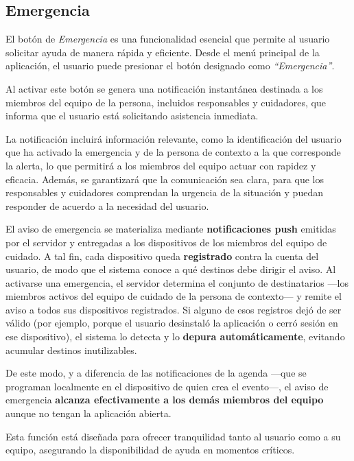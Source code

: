 \documentclass[a4paper,12pt]{article}
\begin{document}
    \subsection{Emergencia}
    \par El botón de \textit{Emergencia} es una funcionalidad esencial que permite al usuario solicitar ayuda de manera rápida y eficiente. Desde el menú principal de la aplicación, el usuario puede presionar el botón designado como \textit{``Emergencia''}.
    \par Al activar este botón se genera una notificación instantánea destinada a los miembros del equipo de la persona, incluidos responsables y cuidadores, que informa que el usuario está solicitando asistencia inmediata.
    \par La notificación incluirá información relevante, como la identificación del usuario que ha activado la emergencia y de la persona de contexto a la que corresponde la alerta, lo que permitirá a los miembros del equipo actuar con rapidez y eficacia. Además, se garantizará que la comunicación sea clara, para que los responsables y cuidadores comprendan la urgencia de la situación y puedan responder de acuerdo a la necesidad del usuario.
    \par El aviso de emergencia se materializa mediante \textbf{notificaciones push} emitidas por el servidor y entregadas a los dispositivos de los miembros del equipo de cuidado. A tal fin, cada dispositivo queda \textbf{registrado} contra la cuenta del usuario, de modo que el sistema conoce a qué destinos debe dirigir el aviso. Al activarse una emergencia, el servidor determina el conjunto de destinatarios —los miembros activos del equipo de cuidado de la persona de contexto— y remite el aviso a todos sus dispositivos registrados. Si alguno de esos registros dejó de ser válido (por ejemplo, porque el usuario desinstaló la aplicación o cerró sesión en ese dispositivo), el sistema lo detecta y lo \textbf{depura automáticamente}, evitando acumular destinos inutilizables.
    \par De este modo, y a diferencia de las notificaciones de la agenda —que se programan localmente en el dispositivo de quien crea el evento—, el aviso de emergencia \textbf{alcanza efectivamente a los demás miembros del equipo} aunque no tengan la aplicación abierta.
    \par Esta función está diseñada para ofrecer tranquilidad tanto al usuario como a su equipo, asegurando la disponibilidad de ayuda en momentos críticos.
\end{document}

